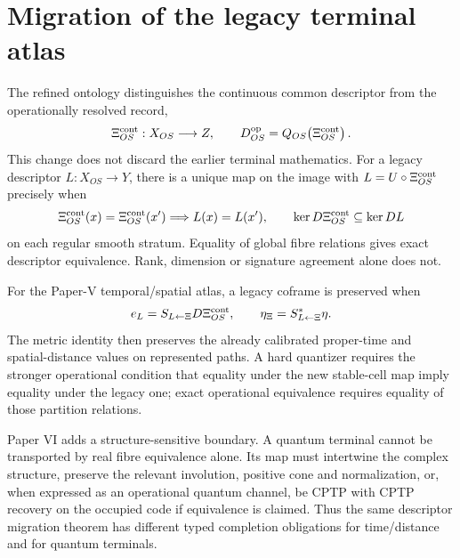 \documentclass[11pt]{article}
\begin{document}
\section{Migration of the legacy terminal atlas}

The refined ontology distinguishes the continuous common descriptor from the
operationally resolved record,
\begin{equation}
 \Xi^{\rm cont}_{OS}:X_{OS}\longrightarrow Z,
 \qquad
 D^{\rm op}_{OS}=Q_{OS}\!\left(\Xi^{\rm cont}_{OS}\right).
 \label{eq:synthesis-continuous-operational-readout}
\end{equation}
This change does not discard the earlier terminal mathematics.  For a legacy
descriptor \(L:X_{OS}\to Y\), there is a unique map on the image with
\(L=U\circ\Xi^{\rm cont}_{OS}\) precisely when
\begin{equation}
 \Xi^{\rm cont}_{OS}(x)=\Xi^{\rm cont}_{OS}(x')
 \Longrightarrow L(x)=L(x'),
 \qquad
 \ker D\Xi^{\rm cont}_{OS}\subseteq\ker DL
 \label{eq:synthesis-mopr-migration}
\end{equation}
on each regular smooth stratum.  Equality of global fibre relations gives
exact descriptor equivalence.  Rank, dimension or signature agreement alone
does not.

For the Paper-V temporal/spatial atlas, a legacy coframe is preserved when
\begin{equation}
 e_L=S_{L\leftarrow\Xi}D\Xi^{\rm cont}_{OS},
 \qquad
 \eta_\Xi=S_{L\leftarrow\Xi}^{*}\eta .
 \label{eq:synthesis-coframe-migration}
\end{equation}
The metric identity then preserves the already calibrated proper-time and
spatial-distance values on represented paths.  A hard quantizer requires the
stronger operational condition that equality under the new stable-cell map
imply equality under the legacy one; exact operational equivalence requires
equality of those partition relations.

Paper VI adds a structure-sensitive boundary.  A quantum terminal cannot be
transported by real fibre equivalence alone.  Its map must intertwine the
complex structure, preserve the relevant involution, positive cone and
normalization, or, when expressed as an operational quantum channel, be CPTP
with CPTP recovery on the occupied code if equivalence is claimed.  Thus the
same descriptor migration theorem has different typed completion obligations
for time/distance and for quantum terminals.
\end{document}
